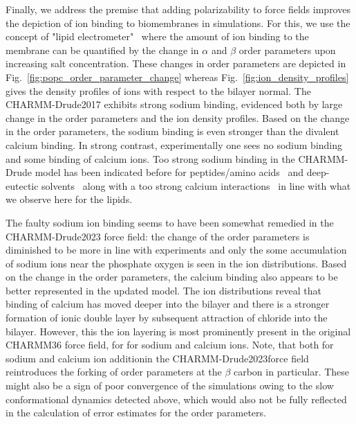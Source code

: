 \documentclass[journal=jacsat,manuscript=article,layout=singlecolumn]{achemso}
\begin{document}
Finally, we address the premise that adding polarizability to force fields improves the depiction of ion binding to biomembranes in simulations. For this, we use the concept of "lipid electrometer"~\cite{Catte2016} where the amount of ion binding to the membrane can be quantified by the change in $\alpha$ and $\beta$ order parameters upon increasing salt concentration. These changes in order parameters are depicted in Fig.~\ref{fig:popc_order_parameter_change} whereas Fig.~\ref{fig:ion_density_profiles} gives the density profiles of ions with respect to the bilayer normal. The CHARMM-Drude2017 exhibits strong sodium binding, evidenced both by large change in the order parameters and the ion density profiles. Based on the change in the order parameters, the sodium binding is even stronger than the divalent calcium binding. In strong contrast, experimentally one sees no sodium binding and some binding of calcium ions. Too strong sodium binding in the CHARMM-Drude model has been indicated before for peptides/amino acids~\cite{Ngo2019, Kav2022} and deep-eutectic solvents~\cite{shayestehpour2022ion} along with a too strong calcium interactions~\cite{Tan2022} in line with what we observe here for the lipids. 

The faulty sodium ion binding seems to have been somewhat remedied in the CHARMM-Drude2023 force field: the change of the order parameters is diminished to be more in line with experiments and only the some accumulation of sodium ions near the phosphate oxygen is seen in the ion distributions. Based on the change in the order parameters, the calcium binding also appears to be better represented in the updated model. The ion distributions reveal that binding of calcium has moved deeper into the bilayer and there is a stronger formation of ionic double layer by subsequent attraction of chloride into the bilayer. However, this the ion layering is most prominently present in the original CHARMM36 force field, for for sodium and calcium ions. Note, that both for sodium and calcium ion additionin the CHARMM-Drude2023force field reintroduces the forking of order parameters at the $\beta$ carbon in particular. These might also be a sign of poor convergence of the simulations owing to the slow conformational dynamics detected above, which would also not be fully reflected in the calculation of error estimates for the order parameters. 
\end{document}
